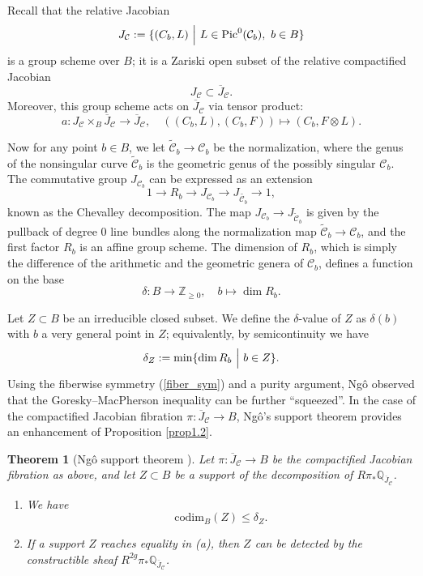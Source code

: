 \documentclass{pspum-l}
\theoremstyle{plain}
\newtheorem{thm}{Theorem}[section]
\theoremstyle{definition}
\theoremstyle{remark}
\newcommand{\BQ}{{\mathbb{Q}}}
\newcommand{\BZ}{{\mathbb{Z}}}
\newcommand{\CC}{{\mathcal C}}
\begin{document}
Recall that the relative Jacobian 
\[
J_\CC :=\{(C_b, L) ~\Big{|} ~ L \in \mathrm{Pic}^0(\CC_b), ~ b \in B\}
\]
is a group scheme over $B$; it is a Zariski open subset of the relative compactified Jacobian
\[
J_\CC \subset \overline{J}_\CC.
\]
Moreover, this group scheme acts on $\overline{J}_\CC$ via tensor product:
\begin{equation}\label{fiber_sym}
a: J_\CC \times_B \overline{J}_\CC \to \overline{J}_\CC, \quad \left((C_b,L), (C_b,F)\right) \mapsto (C_b, F\otimes L).
\end{equation}

Now for any point $b\in B$, we let $\widetilde{\CC}_b \to \CC_b$ be the normalization, where the genus of the nonsingular curve $\widetilde{\CC}_b$ is the geometric genus of the possibly singular $\CC_b$. The commutative group $J_{\CC_b}$ can be expressed as an extension
\[
1 \to R_b \to J_{\CC_b} \to J_{\widetilde{\CC_b}} \to 1,
\]
known as the Chevalley decomposition. The map $J_{\CC_b} \to J_{\widetilde{\CC}_b}$ is given by the pullback of degree 0 line bundles along the normalization map $\widetilde{\CC}_b \to \CC_b$, and the first factor $R_b$ is an affine group scheme. The dimension of $R_b$, which is simply the difference of the arithmetic and the geometric genera of $\CC_b$, defines a function on the base
\[
\delta: B \to \BZ_{\geq 0}, \quad  b \mapsto \dim R_b.
\]


Let $Z \subset B$ be an irreducible closed subset. We define the $\delta$-value of $Z$ as $\delta(b)$ with $b$ a very general point in $Z$; equivalently, by semicontinuity we have
\[
\delta_Z:=\mathrm{min}\{\dim R_b ~\Big{|}~ b\in Z\}.
\]
Using the fiberwise symmetry (\ref{fiber_sym}) and a purity argument, Ng\^o observed that the Goresky--MacPherson inequality can be further ``squeezed''. In the case of the compactified Jacobian fibration $\pi: \overline{J}_{\CC} \to B$, Ng\^o's support theorem provides an enhancement of Proposition \ref{prop1.2}.

\begin{thm}[Ng\^o support theorem \cite{Ngo}]\label{thm1.3}
    Let $\pi: \overline{J}_\CC \to B$ be the compactified Jacobian fibration as above, and let $Z\subset B$ be a support of the decomposition of $R\pi_*\BQ_{\overline{J}_\CC}$. 
    \begin{enumerate}
        \item[(a)]  We have
        \[
        \mathrm{codim}_B(Z) \leq \delta_Z.
        \]
        \item[(b)] If a support $Z$ reaches equality in (a), then $Z$ can be detected by the constructible sheaf $R^{2g}\pi_*\BQ_{\overline{J}_\CC}$.
    \end{enumerate}
\end{thm}
\end{document}
